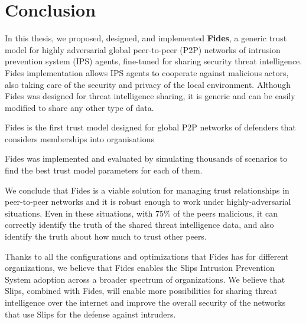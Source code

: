 \chapter{Conclusion}
\label{ch:conclusion}

In this thesis, we proposed, designed, and implemented \textbf{Fides}, a generic trust model for highly adversarial global peer-to-peer (P2P) networks of intrusion prevention system (IPS) agents, fine-tuned for sharing security threat intelligence. Fides implementation allows IPS agents to cooperate against malicious actors, also taking care of the security and privacy of the local environment. 
Although Fides was designed for threat intelligence sharing, it is generic and can be easily modified to share any other type of data. 

Fides is the first trust model designed for global P2P networks of defenders that considers memberships into organisations


Fides was implemented and evaluated by simulating thousands of scenarios to find the best trust model parameters for each of them.

We conclude that Fides is a viable solution for managing trust relationships in peer-to-peer networks and it is robust enough to work under highly-adversarial situations. Even in these situations, with 75\% of the peers malicious, it can correctly identify the truth of the shared threat intelligence data, and also identify the truth about how much to trust other peers.

Thanks to all the configurations and optimizations that Fides has for different organizations, we believe that Fides enables the Slips Intrusion Prevention System adoption across a broader spectrum of organizations.
We believe that Slips, combined with Fides, will enable more possibilities for sharing threat intelligence over the internet and improve the overall security of the networks that use Slips for the defense against intruders.


